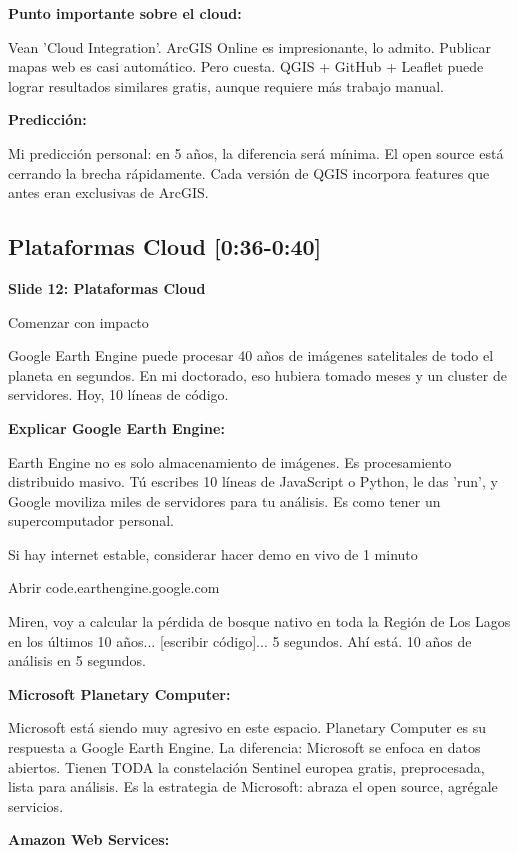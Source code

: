 \documentclass[11pt,a4paper]{article}
\newcommand{\tiempo}[1]{\textcolor{timecolor}{\faIcon{clock} \textbf{[#1]}}}
\newcommand{\decir}[1]{\begin{tcolorbox}[colback=blue!5,colframe=usachblue,title={\faIcon{microphone} DECIR}]#1\end{tcolorbox}}
\newcommand{\hacer}[1]{\begin{tcolorbox}[colback=green!5,colframe=green!50!black,title={\faIcon{hand-point-right} HACER}]#1\end{tcolorbox}}
\newcommand{\alerta}[1]{\begin{tcolorbox}[colback=red!5,colframe=red,title={\faIcon{exclamation-triangle} ALERTA}]#1\end{tcolorbox}}
\begin{document}
\textbf{Punto importante sobre el cloud:}

\decir{Vean 'Cloud Integration'. ArcGIS Online es impresionante, lo admito. Publicar mapas web es casi automático. Pero cuesta. QGIS + GitHub + Leaflet puede lograr resultados similares gratis, aunque requiere más trabajo manual.}

\textbf{Predicción:}

\decir{Mi predicción personal: en 5 años, la diferencia será mínima. El open source está cerrando la brecha rápidamente. Cada versión de QGIS incorpora features que antes eran exclusivas de ArcGIS.}

\subsection{Plataformas Cloud \tiempo{0:36-0:40}}

\textbf{Slide 12: Plataformas Cloud}

\hacer{Comenzar con impacto}

\decir{Google Earth Engine puede procesar 40 años de imágenes satelitales de todo el planeta en segundos. En mi doctorado, eso hubiera tomado meses y un cluster de servidores. Hoy, 10 líneas de código.}

\textbf{Explicar Google Earth Engine:}

\decir{Earth Engine no es solo almacenamiento de imágenes. Es procesamiento distribuido masivo. Tú escribes 10 líneas de JavaScript o Python, le das 'run', y Google moviliza miles de servidores para tu análisis. Es como tener un supercomputador personal.}

\alerta{Si hay internet estable, considerar hacer demo en vivo de 1 minuto}

\hacer{[OPCIONAL] Abrir code.earthengine.google.com}

\decir{[Si haces demo] Miren, voy a calcular la pérdida de bosque nativo en toda la Región de Los Lagos en los últimos 10 años... [escribir código]... 5 segundos. Ahí está. 10 años de análisis en 5 segundos.}

\textbf{Microsoft Planetary Computer:}

\decir{Microsoft está siendo muy agresivo en este espacio. Planetary Computer es su respuesta a Google Earth Engine. La diferencia: Microsoft se enfoca en datos abiertos. Tienen TODA la constelación Sentinel europea gratis, preprocesada, lista para análisis. Es la estrategia de Microsoft: abraza el open source, agrégale servicios.}

\textbf{Amazon Web Services:}
\end{document}
